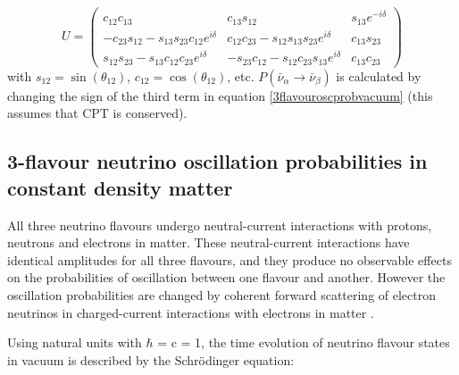 \begin{equation}
U = \left(
\begin{array}{ccc}
c_{12}c_{13} & c_{13}s_{12} & s_{13}e^{-i\delta} \\
-c_{23}s_{12} - s_{13}s_{23}c_{12}e^{i\delta} & c_{12}c_{23} - s_{12}s_{13}s_{23}e^{i\delta} & c_{13}s_{23} \\
s_{12}s_{23} - s_{13}c_{12}c_{23}e^{i\delta} & -s_{23}c_{12} - s_{12}c_{23}s_{13}e^{i\delta} & c_{13}c_{23}
\end{array} \right)
\label{PMNSmatrix}
\end{equation}
with $s_{12} = \sin(\theta_{12})$, $c_{12} = \cos(\theta_{12})$, etc. $P(\bar{\nu}_{\alpha} \rightarrow \bar{\nu}_{\beta})$ 
is calculated by changing the sign of the third term in equation \ref{3flavouroscprobvacuum} (this assumes that CPT is 
conserved).

\subsection{3-flavour neutrino oscillation probabilities in constant density matter}
\label{matterosc}
All three neutrino flavours undergo neutral-current interactions with protons, neutrons and electrons in matter. These 
neutral-current interactions have identical amplitudes for all three flavours, and they produce no observable effects on
the probabilities of oscillation between one flavour and another. However the oscillation probabilities are changed by 
coherent forward scattering of electron neutrinos in charged-current interactions with electrons in matter \cite{kayser2005}.

Using natural units with $\hbar$ = c = 1, the time evolution of neutrino flavour states in vacuum is described by the 
Schr\"odinger equation:

